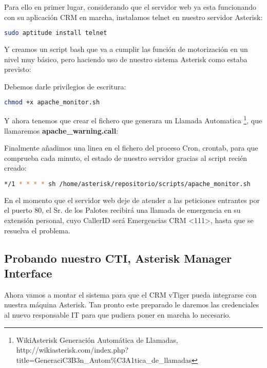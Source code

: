 {Para ello en primer lugar, considerando que el servidor web ya esta funcionando con su aplicación CRM en marcha, instalamos telnet en nuestro servidor Asterisk:

\begin{lstlisting}[language=sh]
sudo aptitude install telnet
\end{lstlisting}

Y creamos un script bash que va a cumplir las función de motorización en un nivel muy básico, pero haciendo uso de nuestro sistema Asterisk como estaba previsto:



Debemos darle privilegios de escritura:

\begin{lstlisting}[language=sh]
chmod +x apache_monitor.sh
\end{lstlisting}

Y ahora tenemos que crear el fichero que generara un Llamada Automatica \footnote{WikiAsterisk Generación Automática de Llamadas, \\ http://wikiasterisk.com/index.php?title=GeneraciC3B3n\_Autom\%C3A1tica\_de\_llamadas}, que llamaremos \textbf{apache\_warning.call}:



Finalmente añadimos una linea en el fichero del proceso Cron, crontab, para que comprueba cada minuto, el estado de nuestro servidor gracias al script recién creado:

\begin{lstlisting}[language=bash,title={/etc/crontab}]
*/1 * * * * sh /home/asterisk/repositorio/scripts/apache_monitor.sh
\end{lstlisting}

En el momento que el servidor web deje de atender a las peticiones entrantes por el puerto 80, el Sr. de los Palotes recibirá una llamada de emergencia en su extensión personal, cuyo CallerID será Emergencias CRM <111>, hasta que se resuelva el problema.

\subsection{Probando nuestro CTI, Asterisk Manager Interface}

Ahora vamos a montar el sistema para que el CRM vTiger pueda integrarse con nuestra máquina Asterisk. Tan pronto este preparado le daremos las credenciales al nuevo responsable IT para que pudiera poner en marcha lo necesario.

}
